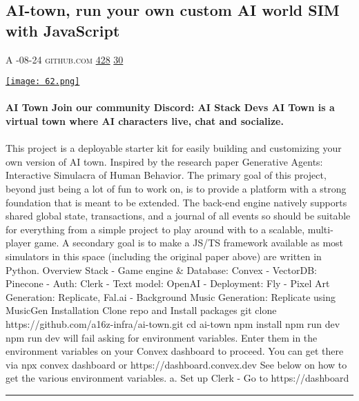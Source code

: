 \documentclass[10pt,a4paper]{article}
\begin{document}
\begin{multicols*}{2}

\noindent\begin{minipage}{\linewidth}
\subsection{AI-town, run your own custom AI world SIM with JavaScript}
\textsc{\footnotesize
{\scriptsize\faUser}\space 
A 
{\scriptsize\faCalendar}-08-24 
{\scriptsize\faGithub}\space 
github.com 
{\scriptsize\faThumbsOUp}\space 
\href{http://news.ycombinator.com/item?id=37128293\&utm\_term=comment}{428} 
{\scriptsize\faComments}\space 
\href{http://news.ycombinator.com/item?id=37128293\&utm\_term=comment}{30} 
}
\par\medskip\noindent
\href{https://github.com/a16z-infra/ai-town?utm\_source=hackernewsletter\&utm\_medium=email\&utm\_term=fun}{
    \texttt{[image: 62.png]}
}
\end{minipage}
\paragraph{}
\textbf{AI Town 
Join our community Discord: AI Stack Devs
AI Town is a virtual town where AI characters live, chat and socialize.}
\paragraph{}

This project is a deployable starter kit for easily building and customizing your own version of AI town. Inspired by the research paper Generative Agents: Interactive Simulacra of Human Behavior.
The primary goal of this project, beyond just being a lot of fun to work on, is to provide a platform with a strong foundation that is meant to be extended. The back-end engine natively supports shared global state, transactions, and a journal of all events so should be suitable for everything from a simple project to play around with to a scalable, multi-player game. A secondary goal is to make a JS/TS framework available as most simulators in this space (including the original paper above) are written in Python.
Overview
Stack
- Game engine \& Database: Convex
- VectorDB: Pinecone
- Auth: Clerk
- Text model: OpenAI
- Deployment: Fly
- Pixel Art Generation: Replicate, Fal.ai
- Background Music Generation: Replicate using MusicGen
Installation
Clone repo and Install packages
git clone https://github.com/a16z-infra/ai-town.git cd ai-town npm install npm run dev
npm run dev will fail asking for environment variables.
Enter them in the environment variables on your Convex dashboard to proceed.
You can get there via
npx convex dashboard or https://dashboard.convex.dev
See below on how to get the various environment variables.
a. Set up Clerk
- Go to https://dashboard
\par\noindent\textcolor{red}{\rule{\linewidth}{0.2mm}}
\vfill
\null
\noindent\begin{minipage}{\linewidth}

\end{minipage}
\end{multicols*}
\end{document}
